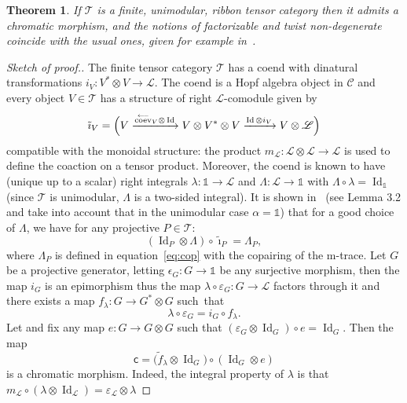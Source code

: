 \documentclass[10pt,a4paper]{amsart}
\newtheorem{theorem}{Theorem}
\numberwithin{equation}{section}
\newcommand{\tto}{\xrightarrow}
\newcommand{\chr}{{\mathsf{c}}}
\numberwithin{theorem}{section}
\numberwithin{proposition}{section}
\numberwithin{definition}{section}
\numberwithin{lemma}{section}
\numberwithin{corollary}{section}
\numberwithin{remark}{section}
\numberwithin{example}{section}
\newcommand{\rev}{\stackrel{\longrightarrow}{\operatorname{ev}}\!\!}
\newcommand{\lcoev}{\stackrel{\longleftarrow}{\operatorname{coev}}}
\newcommand{\ci}{\tilde\imath}
\newcommand{\cat}{\mathcal{C}}
\newcommand{\ttt}{\mathcal{T}}
\newcommand{\coend}{\mathscr{L}}
\newcommand{\unit}{\ensuremath{\mathds{1}}}
\newcommand{\Id}{\operatorname{Id}}
\newcommand{\ve}{\varepsilon}
\newcommand{\wt}{\widetilde}
\begin{document}
\begin{theorem}%
If $\ttt$ is a finite, unimodular, ribbon tensor category then it admits a chromatic morphism, and the notions
of factorizable and twist non-degenerate coincide with the usual ones, given for example in~{\rm \cite{DRGGPMR2022}}.
\end{theorem}
\begin{proof}[Sketch of proof.]
The finite
tensor category $\ttt$ has a coend
\smash{$\coend=\int^{V\in\cat}V^*\otimes V$} with dinatural transformations
$i_V\colon V^*\otimes V\to \coend$. The coend is a Hopf algebra object in
$\cat$ and every object $V\in\ttt$ has a structure of right
$\coend$-comodule given by
\[
\ci_V=\Bigl(V\tto {\lcoev_V\otimes\Id}V\otimes V^*\otimes V\tto
{\Id\otimes i_V}V\otimes\coend\Bigr)
\]
compatible with the monoidal
structure: the product $m_{\!\coend}\colon \coend\otimes\coend\to\coend$ is
used to define the coaction on a tensor product. Moreover, the coend
is known to have (unique up to a scalar) right integrals
$\lambda\colon \unit\to \coend$ and $\Lambda\colon \coend\to\unit$ with
$\Lambda\circ\lambda=\Id_\unit$ (since $\ttt$ is unimodular, $\Lambda$
is a two-sided integral). It is shown in~\cite{CGPV2023b}
(see Lemma 3.2 and take into account that in the unimodular case $\alpha=\unit$) that for a
good choice of $\Lambda$, we have for any projective $P\in\ttt$:
\begin{equation}
 \label{eq:Lambda_coend}
 (\Id_P\otimes\Lambda)\circ\ci_P=\Lambda_P,
\end{equation}
where $\Lambda_P$ is defined in equation~\eqref{eq:cop} with the
copairing of the m-trace. Let $G$ be a projective generator, letting $\epsilon_G\colon G\to \unit$ be any surjective morphism, then the
map $i_G$ is an epimorphism thus the map
$\lambda\circ\ve_G\colon G\to\coend$ factors through it and there exists a
map $f_\lambda\colon G\to G^*\otimes G$ such~that%
\begin{equation}
 \label{eq:flambda}
 \lambda\circ\ve_G=i_G\circ f_\lambda .
\end{equation}
 Let
\smash{$\wt f_\lambda=\bigl(\rev_G\otimes\Id_G\bigr)\circ(\Id_G\otimes f_\lambda)$} and
fix any map $e\colon G\to G\otimes G$ such that
$(\ve_G\otimes\Id_G)\circ e
=\Id_G$. Then the map
\begin{equation}
 \label{eq:chrcoend}
\chr=\bigl(\wt f_\lambda\otimes\Id_G\bigr)\circ(\Id_G\otimes e
)
\end{equation}
is a chromatic morphism. Indeed, the integral property of $\lambda$ is
that
$m_\coend\circ(\lambda\otimes \Id_\coend)=\ve_\coend\otimes \lambda$

\end{proof}
\end{document}
